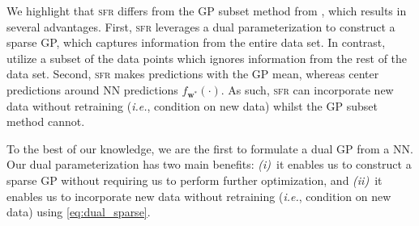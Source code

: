 \documentclass{article}
\makeatletter
\newcommand{\ie}{\textit{i.e.\@}\xspace}
\newcommand{\our}{\textsc{sfr}\xspace}
\newcommand{\mbf}[1]{\mathbf{#1}}
\newcommand{\vw}{\mbf{w}}
\makeatother
\begin{document}
We highlight that \our differs from the GP subset method from \citet{immer2021improving}, which results in several advantages.
First, \our leverages a dual parameterization to construct a sparse GP, which captures information from the entire data set.
In contrast, \citet{immer2021improving} utilize a subset of the data points which ignores information from the rest of the data set.
Second, \our makes predictions with the GP mean, whereas \citet{immer2021improving} center predictions around NN predictions $f_{\vw^*}(\cdot)$.
As such, \our can incorporate new data without retraining (\ie, condition on new data) whilst the GP subset method cannot.

To the best of our knowledge, we are the first to formulate a dual GP from a NN.
Our dual parameterization has two main benefits: {\em (i)}~it enables us to construct a sparse GP without requiring us to perform further optimization, and {\em (ii)}~it enables us to incorporate new data without retraining (\ie, condition on new data) using \cref{eq:dual_sparse}.






\end{document}
